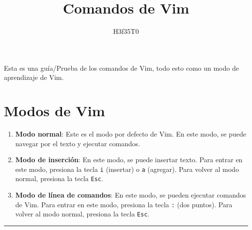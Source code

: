 \documentclass{article}[12pt,a4paper,twoside,utf8,spanish]
\title{Comandos de Vim}
\author{H3f35T0}
\theoremstyle{mytheoremstyle}
\theoremstyle{mytheoremstyle}
\theoremstyle{myproblemstyle}
\begin{document}
    \maketitle
    Esta es una guía/Prueba de los comandos de Vim, todo esto como un modo de aprendizaje de Vim.
    \section*{Modos de Vim}
    \begin{enumerate}[label=(\alph*)]
        \item \textbf{Modo normal}: Este es el modo por defecto de Vim. En este modo, se  puede navegar por el texto y ejecutar comandos. 
        \item \textbf{Modo de inserción}: En este modo, se puede insertar texto. Para entrar en este modo, presiona la tecla \texttt{i} (insertar) o \texttt{a} (agregar). Para volver al modo normal, presiona la tecla \texttt{Esc}.
        \item \textbf{Modo de línea de comandos}: En este modo, se pueden ejecutar comandos de Vim. Para entrar en este modo, presiona la tecla \texttt{:} (dos puntos). Para volver al modo normal, presiona la tecla \texttt{Esc}.
    \end{enumerate}
    \vspace{1cm}
    \hrule
    \vspace{1cm}
\end{document}
